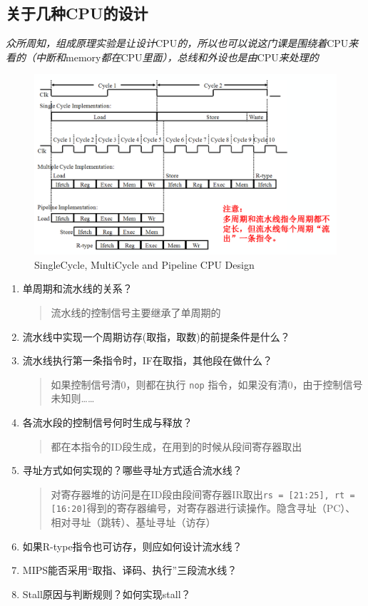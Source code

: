 \documentclass[]{report}
\begin{document}
	\subsection{关于几种CPU的设计}
		\textit{众所周知，组成原理实验是让设计}CPU\textit{的，所以也可以说这门课是围绕着}CPU\textit{来看的（中断和}memory\textit{都在}CPU\textit{里面），总线和外设也是由}CPU\textit{来处理的}
		\begin{figure}[h]
			\centering
			\includegraphics[scale = 0.23]{images/CPU_method.png}
			\caption{SingleCycle, MultiCycle and Pipeline CPU Design}
		\end{figure}
		\begin{enumerate}
			\item 单周期和流水线的关系？
			\begin{quote}
				流水线的控制信号主要继承了单周期的
			\end{quote}
			\item 流水线中实现一个周期访存(取指，取数)的前提条件是什么？
			\item 流水线执行第一条指令时，IF在取指，其他段在做什么？
			\begin{quote}
				如果控制信号清0，则都在执行 \verb|nop| 指令，如果没有清0，由于控制信号未知则……
			\end{quote}
			\item 各流水段的控制信号何时生成与释放？
			\begin{quote}
				都在本指令的ID段生成，在用到的时候从段间寄存器取出
			\end{quote}
			\item 寻址方式如何实现的？哪些寻址方式适合流水线？
			\begin{quote}
				对寄存器堆的访问是在ID段由段间寄存器IR取出\verb|rs = [21:25], rt = [16:20]|得到的寄存器编号，对寄存器进行读操作。隐含寻址（PC）、相对寻址（跳转）、基址寻址（访存）
			\end{quote}
			\item 如果R-type指令也可访存，则应如何设计流水线？
			\item MIPS能否采用“取指、译码、执行”三段流水线？
			\item Stall原因与判断规则？如何实现stall？
		\end{enumerate}
\end{document}

